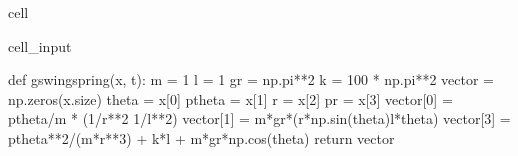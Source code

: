 \documentclass[letterpaper,10pt,english]{jupyterBook}
\begin{document}
\begin{sphinxuseclass}{cell}\begin{sphinxVerbatimInput}

\begin{sphinxuseclass}{cell_input}
\begin{sphinxVerbatim}[commandchars=\\\{\}]
def g\PYGZus{}swing\PYGZus{}spring(x, t):
  m = 1
  l = 1
  gr = np.pi**2
  k = 100 * np.pi**2
  vector = np.zeros(x.size)
  theta = x[0]
  p\PYGZus{}theta = x[1]
  r = x[2]
  pr = x[3]
  vector[0] = p\PYGZus{}theta/m * (1/r**2 \PYGZhy{} 1/l**2)
  vector[1] = \PYGZhy{}m*gr*(r*np.sin(theta)\PYGZhy{}l*theta)
  vector[3] = p\PYGZus{}theta**2/(m*r**3) + k*l + m*gr*np.cos(theta)
  return vector
\end{sphinxVerbatim}

\end{sphinxuseclass}\end{sphinxVerbatimInput}

\end{sphinxuseclass}
\end{document}
